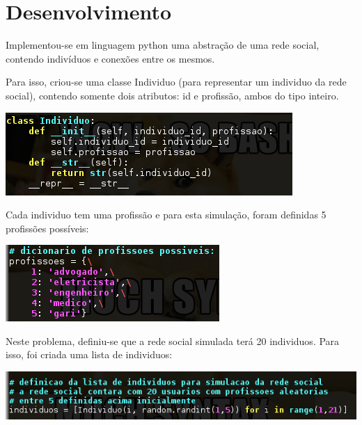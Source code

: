 

\section{Desenvolvimento}\label{sec:desenvolvimento}	%

Implementou-se em linguagem python uma abstração de uma rede social, contendo indivíduos e conexões entre os mesmos.

Para isso, criou-se uma classe Individuo (para representar um individuo da rede social), contendo somente dois atributos: id e profissão, ambos do tipo inteiro.

\begin{center}
  \includegraphics[scale=0.45]{./02-figuras/individuo.png}
  \label{fig:patoA}
\end{center}

Cada individuo tem uma profissão e para esta simulação, foram definidas 5 profissões possíveis:

\begin{center}
  \includegraphics[scale=0.45]{./02-figuras/profissoes.png}
  \label{fig:patoA}
\end{center}


Neste problema, definiu-se que a rede social simulada terá 20 individuos. Para isso, foi criada uma lista de individuos:

\begin{center}
  \includegraphics[scale=0.35]{./02-figuras/lista_individuos.png}
  \label{fig:patoA}
\end{center}

